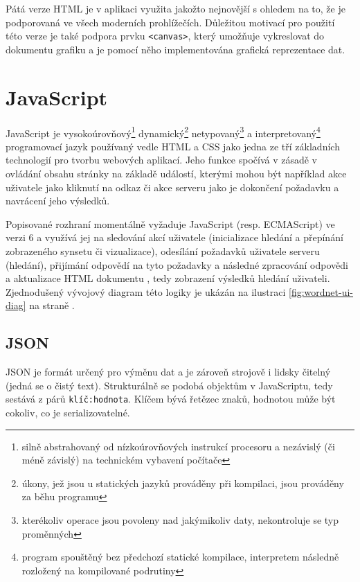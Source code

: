 \documentclass[a4paper, 11pt, oneside]{book}
\begin{document}
				Pátá verze HTML je v aplikaci využita jakožto nejnovější s ohledem na to, že je podporovaná ve všech moderních prohlížečích. \parencite{html5support} Důležitou motivací pro použití této verze je také podpora prvku \texttt{<canvas>}, který umožňuje vykreslovat do dokumentu grafiku \parencite{w3schools2017htmlcanvas} a je pomocí něho implementována grafická reprezentace dat. 

			\section{JavaScript}

				JavaScript je vysokoúrovňový\footnote{silně abstrahovaný od nízkoúrovňových instrukcí procesoru a nezávislý (či méně závislý) na technickém vybavení počítače} dynamický\footnote{úkony, jež jsou u statických jazyků prováděny při kompilaci, jsou prováděny za běhu programu} netypovaný\footnote{kterékoliv operace jsou povoleny nad jakýmikoliv daty, nekontroluje se typ proměnných} a interpretovaný\footnote{program spouštěný bez předchozí statické kompilace, interpretem následně rozložený na kompilované podrutiny} programovací jazyk používaný vedle HTML a CSS jako jedna ze tří základních technologií pro tvorbu webových aplikací. Jeho funkce spočívá v zásadě v ovládání obsahu stránky na základě událostí, kterými mohou být například akce uživatele jako kliknutí na odkaz či akce serveru jako je dokončení požadavku a navrácení jeho výsledků.%

				Popisované rozhraní momentálně vyžaduje JavaScript (resp. ECMAScript) ve verzi 6 a využívá jej na sledování akcí uživatele (inicializace hledání a přepínání zobrazeného synsetu či vizualizace), odesílání požadavků uživatele serveru (hledání), přijímání odpovědí na tyto požadavky a následné zpracování odpovědi a aktualizace HTML dokumentu%
				, tedy zobrazení výsledků hledání uživateli. %
				Zjednodušený vývojový diagram této logiky je ukázán na ilustraci \ref{fig:wordnet-ui-diag} na straně \pageref{fig:wordnet-ui-diag}.

				\subsection{JSON}
				\label{cha:json}

					JSON je formát určený pro výměnu dat a je zároveň strojově i lidsky čitelný (jedná se o čistý text). Strukturálně se podobá objektům v JavaScriptu, tedy sestává z párů \texttt{klíč:hodnota}. Klíčem bývá řetězec znaků, hodnotou může být cokoliv, co je serializovatelné. \parencite{jsonDoc}
\end{document}

